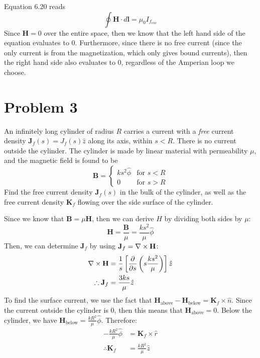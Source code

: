 \documentclass[10pt]{article}
\begin{document}
\begin{enumerate}[label=\alph*)]
			\begin{solution}
				Equation 6.20 reads 
				\[
					\oint \mathbf H \cdot d\mathbf l = \mu_0 I_{f_{enc}}
				\] 
				Since $\mathbf H = 0$ over the entire space, then we know that the left hand side of the equation
				evaluates to 0. Furthermore, since there is no free current (since the only current is from the 
				magnetization, which only gives bound currents), then the right hand side also evaluates to 
				0, regardless of the Amperian loop we choose. 
			\end{solution}
	\end{enumerate}


	\pagebreak
	\section*{Problem 3}
	An infinitely long cylinder of radius $R$ carries a current with a \textit{free} current density 
	$\mathbf J_f(s) = J_f(s) \hat{z}$ along its axis, within $s < R$. There is no current outside the cylinder.
	The cylinder is made by linear material with permeability $\mu$, and the magnetic field is found to be 
	\[
	\mathbf B = \begin{cases}
		ks^2 \hat{\phi} & \text{for $s < R$}\\
		0 & \text{for $s > R$}
	\end{cases}
	\] 
	Find the free current density $\mathbf J_f(s)$ in the bulk of the cylinder, as well as the free current 
	density $\mathbf K_f$ flowing over the side surface of the cylinder. 


	\begin{solution}
		Since we know that $\mathbf B = \mu \mathbf H$, then we can derive $H$ by dividing both sides by $\mu$:
		\[
		\mathbf H = \frac{\mathbf B}{\mu} = \frac{ks^2}{\mu}\hat{\phi}
		\] 
		Then, we can determine $\mathbf J_f$ by using $\mathbf J_f = \nabla \times \mathbf H$:
		\begin{align*}
			\nabla \times \mathbf H &= \frac{1}{s}\left[\pdv{s}\left(s \frac{ks^2}{\mu}\right)\right]\hat{z}\\
			\therefore \mathbf J_f &= \frac{3ks}{\mu}\hat{z}
		\end{align*}
		To find the surface current, we use the fact that
		$\mathbf H_{\text{above}} - \mathbf H_{\text{below}} = \mathbf K_f \times \hat{n}$. Since the current outside the 
		cylinder is 0, then this means that $\mathbf H_{\text{above}} = 0$. Below the cylinder, we have 
		$\mathbf H_{\text{below}} = \frac{kR^2}{\mu}\hat{\phi}$. Therefore:
		\begin{align*}
			-\frac{kR^2}{\mu}\hat{\phi} &= \mathbf K_f \times \hat{r}\\
			\therefore \mathbf K_f &= \frac{kR^2}{\mu}\hat{z}
		\end{align*}
	\end{solution}
	
\end{document}
